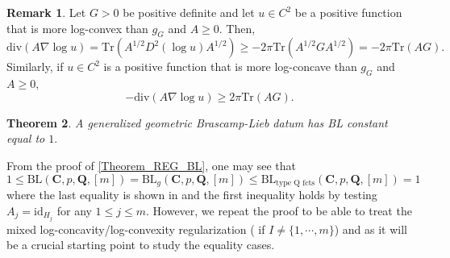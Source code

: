 \documentclass[11pt,a4paper,reqno]{amsart}
\numberwithin{equation}{section}
\newtheorem{theorem}{Theorem}[section]
\theoremstyle{definition}
\newtheorem{remark}[theorem]{Remark}
\newcommand{\<}{\ensuremath \leq}
\renewcommand{\>}{\ensuremath \geq}
\begin{document}
\begin{remark}
    Let $G>0$ be positive definite and let $u \in C^2$ be a positive function that is more log-convex than $g_G$ and $A \geq 0.$ Then, $$\mathrm{div}(A\nabla \log u)=\mathrm{Tr}(A^{1/2}D^2(\log u)A^{1/2}) \geq -2\pi \mathrm{Tr}(A^{1/2}GA^{1/2})=-2\pi \mathrm{Tr}(AG).$$ Similarly, if $u \in C^2$ is a positive function that is more log-concave than $g_G$ and $A \ge 0$, $$-\mathrm{div}(A\nabla \log u) \ge 2\pi \mathrm{Tr}(AG).$$
\end{remark}




\begin{theorem} \label{BL_Geometric_equals_1}
A generalized geometric Brascamp-Lieb datum has BL constant equal to $1.$
\end{theorem}

From the proof of \cref{Theorem_REG_BL}, one may see that $$1 \leq \mathrm{BL}(\textbf{C},p,\textbf{Q},[m])=\mathrm{BL}_g(\textbf{C},p,\textbf{Q},[m]) \leq \mathrm{BL}_{\text{type Q fcts}}(\textbf{C},p,\textbf{Q},[m])=1$$ where the last equality is shown in \cite[Prop 8.9]{BCCT} and the first inequality holds by testing $A_j=\mathrm{id}_{H_j}$ for any $1 \leq j \leq m.$ However, we repeat the proof to be able to treat the mixed log-concavity/log-convexity regularization ( if $I \neq \{1,\cdots,m\}$) and as it will be a crucial starting point to study the equality cases. 

\hfill \\
\end{document}
